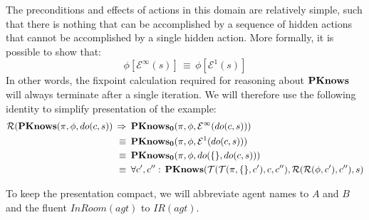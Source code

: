 The preconditions and effects of actions in this domain are relatively
simple, such that there is nothing that can be accomplished by a sequence
of hidden actions that cannot be accomplished by a single hidden action.
More formally, it is possible to show that:\[
\phi[\mathcal{E}^{\infty}(s)]\,\equiv\,\phi[\mathcal{E}^{1}(s)]\]
 In other words, the fixpoint calculation required for reasoning about
$\mathbf{PKnows}$ will always terminate after a single iteration. We will
therefore use the following identity to simplify presentation of the
example:\begin{align*}
\mathcal{R}(\mathbf{PKnows}(\pi,\phi,do(c,s))\,\Rightarrow & \,\,\,\mathbf{PKnows_{0}}(\pi,\phi,\mathcal{E}^{\infty}(do(c,s)))\\
\equiv & \,\,\,\mathbf{PKnows_{0}}(\pi,\phi,\mathcal{E}^{1}(do(c,s)))\\
\equiv & \,\,\,\mathbf{PKnows_{0}}(\pi,\phi,do(\{\},do(c,s)))\\
\equiv & \,\,\,\forall c',c'':\,\mathbf{PKnows}(\mathcal{T}(\mathcal{T}(\pi,\{\},c'),c,c''),\mathcal{R}(\mathcal{R}(\phi,c'),c''),s)\end{align*}


To keep the presentation compact, we will abbreviate agent names to
$A$ and $B$ and the fluent $InRoom(agt)$ to $IR(agt)$.

